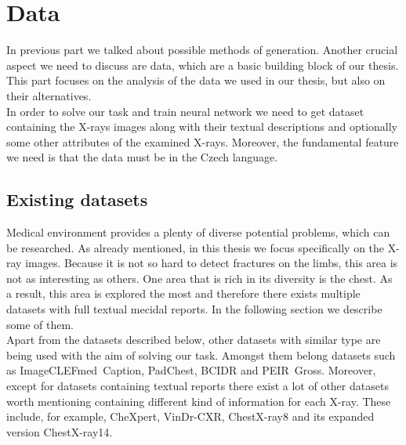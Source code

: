 \section{Data}
In previous part we talked about possible methods of generation. Another crucial aspect we need to discuss are data, which are a basic building block of our thesis. This part focuses on the analysis of the data we used in our thesis, but also on their alternatives. \\

In order to solve our task and train neural network we need to get dataset containing the X-rays images along with their textual descriptions and optionally some other attributes of the examined X-rays. Moreover, the fundamental feature we need is that the data must be in the Czech language.

\subsection{Existing datasets}
\label{sec:datasets}
Medical environment provides a plenty of diverse potential problems, which can be researched. As already mentioned, in this thesis we focus specifically on the X-ray images. Because it is not so hard to detect fractures on the limbs, this area is not as interesting as others. One area that is rich in its diversity is the chest. As a result, this area is explored the most and therefore there exists multiple datasets with full textual mecidal reports. In the following section we describe some of them.\\

Apart from the datasets described below, other datasets with similar type are being used with the aim of solving our task. Amongst them belong datasets such as ImageCLEFmed~Caption\citep{ImageCLEFmedicalCaptionOverview2022}, PadChest\citep{bustos2020padchest}, BCIDR\citep{zhang2017mdnet} and PEIR~Gross\citep{jing2017automatic}. Moreover, except for datasets containing textual reports there exist a lot of other datasets worth mentioning containing different kind of information for each X-ray. These include, for example, CheXpert\citep{irvin2019chexpert}, VinDr-CXR\citep{nguyen2020vindr}, ChestX-ray8\citep{wang2017chestx} and its expanded version ChestX-ray14.


